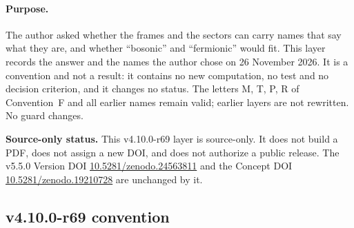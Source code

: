 \paragraph{Purpose.}
The author asked whether the frames and the sectors can carry names that say what they are, and whether ``bosonic'' and ``fermionic'' would
fit.  This layer records the answer and the names the author chose on 26 November 2026.  It is a convention and not a result: it contains no
new computation, no test and no decision criterion, and it changes no status.  The letters M, T, P, R of Convention~F and all earlier names
remain valid; earlier layers are not rewritten.  No guard changes.

\noindent\textbf{Source-only status.}
This v4.10.0-r69 layer is source-only.  It does not build a PDF, does not assign a new DOI,
and does not authorize a public release.  The v5.5.0 Version DOI
\href{https://doi.org/10.5281/zenodo.24563811}{10.5281/zenodo.24563811} and the Concept DOI
\href{https://doi.org/10.5281/zenodo.19210728}{10.5281/zenodo.19210728} are unchanged by it.

\subsection*{v4.10.0-r69 convention}
\label{subsec:v4100-r69-convention}

